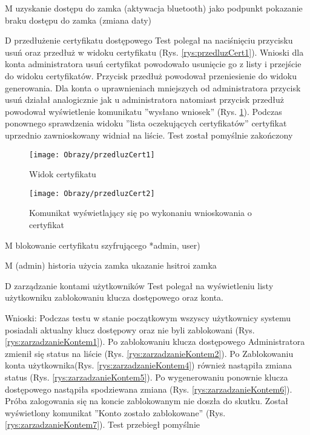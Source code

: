 \begin{enumerate*}
\begin{figure}[ht!]
	
	\end{figure}
	
	
	\item M uzyskanie dostępu do zamka (aktywacja bluetooth)
		 jako podpunkt pokazanie braku dostępu do zamka (zmiana daty)
	\item D przedłużenie certyfikatu dostępowego
	Test polegał na naciśnięciu przycisku usuń oraz przedłuż w widoku certyfikatu (Rys. \ref{rys:przedluzCert1}).
	Wnioski dla konta administratora usuń certyfikat powodowało usunięcie go z listy i przejście do widoku certyfikatów. Przycisk przedłuż powodował przeniesienie do widoku generowania. Dla konta o uprawnieniach  mniejszych od administratora przycisk usuń działał analogicznie jak u administratora natomiast przycisk przedłuż powodował wyświetlenie komunikatu ''wysłano wniosek'' (Rys. \ref{rys:przedluzCert2}).
	Podczas ponownego sprawdzenia  widoku ''lista oczekujących certyfikatów'' certyfikat uprzednio zawnioskowany  widniał  na liście. Test został pomyślnie zakończony
	
	
		\begin{figure}[ht!]
		
		\begin{minipage}{0.2\textwidth}
			\texttt{[image: Obrazy/przedluzCert1]}
			\caption{Widok certyfikatu }
			\label{rys:przedluzCert1}
		\end{minipage}
		
		\begin{minipage}{0.2\textwidth}
			\texttt{[image: Obrazy/przedluzCert2]}
			\caption{Komunikat wyświetlający się po wykonaniu wnioskowania o certyfikat }
			\label{rys:przedluzCert2}
		\end{minipage}
		
		
	
		
	\end{figure}
	
	
	\item M blokowanie certyfikatu szyfrującego *admin, user)
	\item M (admin) historia użycia zamka
	ukazanie hsitroi zamka
	\item D zarządzanie kontami użytkowników
		Test polegał na wyświetleniu listy użytkowniku zablokowaniu klucza dostępowego oraz konta.
		
		Wnioski: Podczas testu w stanie początkowym wszyscy użytkownicy systemu posiadali aktualny klucz dostępowy oraz nie byli zablokowani (Rys. \ref{rys:zarzadzanieKontem1}). Po zablokowaniu klucza dostępowego  Administratora zmienił się status na liście (Rys. \ref{rys:zarzadzanieKontem2}). Po Zablokowaniu konta użytkownika(Rys. \ref{rys:zarzadzanieKontem4}) również nastąpiła zmiana  status  (Rys. \ref{rys:zarzadzanieKontem5}). Po wygenerowaniu ponownie klucza dostępowego nastąpiła spodziewana zmiana (Rys. \ref{rys:zarzadzanieKontem6}). Próba zalogowania się na koncie zablokowanym nie doszła do skutku. Został wyświetlony komunikat ''Konto zostało zablokowane'' (Rys. \ref{rys:zarzadzanieKontem7}). Test przebiegł pomyślnie
		

\end{enumerate*}
